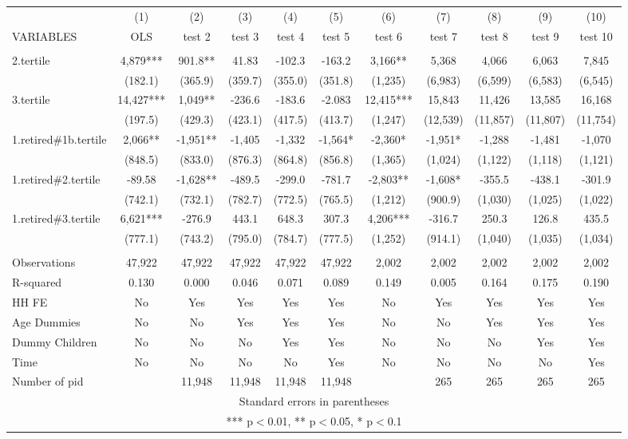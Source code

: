 \begin{tabular}{lcccccccccc} \hline
 & (1) & (2) & (3) & (4) & (5) & (6) & (7) & (8) & (9) & (10) \\
VARIABLES & OLS & test 2 & test 3 & test 4 & test 5 & test 6 & test 7 & test 8 & test 9 & test 10 \\ \hline
 &  &  &  &  &  &  &  &  &  &  \\
2.tertile & 4,879*** & 901.8** & 41.83 & -102.3 & -163.2 & 3,166** & 5,368 & 4,066 & 6,063 & 7,845 \\
 & (182.1) & (365.9) & (359.7) & (355.0) & (351.8) & (1,235) & (6,983) & (6,599) & (6,583) & (6,545) \\
3.tertile & 14,427*** & 1,049** & -236.6 & -183.6 & -2.083 & 12,415*** & 15,843 & 11,426 & 13,585 & 16,168 \\
 & (197.5) & (429.3) & (423.1) & (417.5) & (413.7) & (1,247) & (12,539) & (11,857) & (11,807) & (11,754) \\
1.retired\#1b.tertile & 2,066** & -1,951** & -1,405 & -1,332 & -1,564* & -2,360* & -1,951* & -1,288 & -1,481 & -1,070 \\
 & (848.5) & (833.0) & (876.3) & (864.8) & (856.8) & (1,365) & (1,024) & (1,122) & (1,118) & (1,121) \\
1.retired\#2.tertile & -89.58 & -1,628** & -489.5 & -299.0 & -781.7 & -2,803** & -1,608* & -355.5 & -438.1 & -301.9 \\
 & (742.1) & (732.1) & (782.7) & (772.5) & (765.5) & (1,212) & (900.9) & (1,030) & (1,025) & (1,022) \\
1.retired\#3.tertile & 6,621*** & -276.9 & 443.1 & 648.3 & 307.3 & 4,206*** & -316.7 & 250.3 & 126.8 & 435.5 \\
 & (777.1) & (743.2) & (795.0) & (784.7) & (777.5) & (1,252) & (914.1) & (1,040) & (1,035) & (1,034) \\
 &  &  &  &  &  &  &  &  &  &  \\
Observations & 47,922 & 47,922 & 47,922 & 47,922 & 47,922 & 2,002 & 2,002 & 2,002 & 2,002 & 2,002 \\
R-squared & 0.130 & 0.000 & 0.046 & 0.071 & 0.089 & 0.149 & 0.005 & 0.164 & 0.175 & 0.190 \\
HH FE & No & Yes & Yes & Yes & Yes & No & Yes & Yes & Yes & Yes \\
Age Dummies & No & No & Yes & Yes & Yes & No & No & Yes & Yes & Yes \\
Dummy Children & No & No & No & Yes & Yes & No & No & No & Yes & Yes \\
Time & No & No & No & No & Yes & No & No & No & No & Yes \\
 Number of pid &  & 11,948 & 11,948 & 11,948 & 11,948 &  & 265 & 265 & 265 & 265 \\ \hline
\multicolumn{11}{c}{ Standard errors in parentheses} \\
\multicolumn{11}{c}{ *** p$<$0.01, ** p$<$0.05, * p$<$0.1} \\
\end{tabular}

